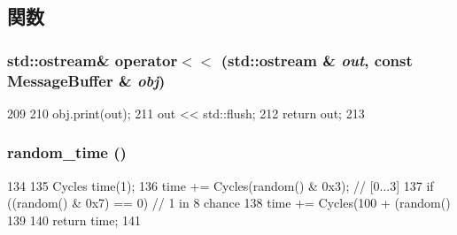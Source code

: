 \subsection{関数}
\hypertarget{MessageBuffer_8hh_a5434526dc83528c47b8c526f981f7c3f}{
\subsubsection[{operator$<$$<$}]{\setlength{\rightskip}{0pt plus 5cm}std::ostream\& operator$<$$<$ (std::ostream \& {\em out}, \/  const {\bf MessageBuffer} \& {\em obj})}}
\label{MessageBuffer_8hh_a5434526dc83528c47b8c526f981f7c3f}



\begin{DoxyCode}
209 {
210     obj.print(out);
211     out << std::flush;
212     return out;
213 }
\end{DoxyCode}
\hypertarget{MessageBuffer_8hh_a90ad9a05733c8b95a6f383ef561bd0d5}{
\subsubsection[{random\_\-time}]{ random\_\-time ()}}
\label{MessageBuffer_8hh_a90ad9a05733c8b95a6f383ef561bd0d5}



\begin{DoxyCode}
134 {
135     Cycles time(1);
136     time += Cycles(random() & 0x3);  // [0...3]
137     if ((random() & 0x7) == 0) {  // 1 in 8 chance
138         time += Cycles(100 + (random() %
139     }
140     return time;
141 }
\end{DoxyCode}

